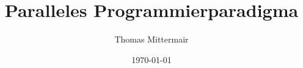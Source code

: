 



	\parindent 0cm 
	
	\title{Paralleles Programmierparadigma}
	\author{Thomas Mittermair}
	\date{\today}

	
	\clearpage
	
	
	\clearpage
	
	
	\clearpage

	\setcounter{page}{1}
	
	\setcounter{tocdepth}{2} %
	\tableofcontents
	\cleardoublepage
	
	\setcounter{page}{1}
	
	
	
	\cleardoublepage
	
	
	
	\cleardoublepage
	
	
	
	\cleardoublepage

	
	
	\cleardoublepage
	
	\setcounter{page}{1}
	
	\printbibliography %
	
	\listoffigures %
	
	\listoftables %
